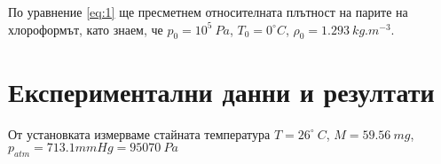 \documentclass[%
 reprint,
 amsmath,amssymb,
 aps,
]{revtex4-2}
\newcommand{\degree}{^{\circ}}
\begin{document}
По уравнение \eqref{eq:1} ще пресметнем относителната плътност на парите на хлороформът, като знаем, че $p_0 = 10^5 \ Pa$, $T_0 = 0\degree C$, $\rho_0 = 1.293 \ \si{kg.m^{-3}}$.

\section{Експериментални данни и резултати}

От установката измерваме стайната температура $T = 26\degree \ C$, $M = 59.56 \ \si{mg}$, $p_{atm} = 713.1 \si{mmHg} = 95070 \ \si{Pa}$ 
\end{document}
